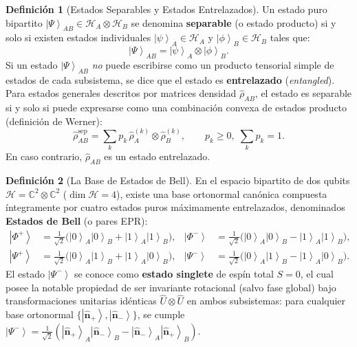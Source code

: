 \documentclass[11pt,a4paper,twoside]{report}
\theoremstyle{definition}
\newtheorem{definicion}{Definición}[chapter]
\theoremstyle{plain}
\theoremstyle{remark}
\newcommand{\ket}[1]{\left| #1 \right\rangle}
\newcommand{\Hil}{\mathcal{H}}
\newcommand{\op}[1]{\hat{#1}}
\begin{document}
\begin{definicion}[Estados Separables y Estados Entrelazados]
Un estado puro bipartito $\ket{\Psi}_{AB} \in \Hil_A \otimes \Hil_B$ se denomina \textbf{separable} (o estado producto) si y solo si existen estados individuales $\ket{\psi}_A \in \Hil_A$ y $\ket{\phi}_B \in \Hil_B$ tales que:
\begin{equation}
    \ket{\Psi}_{AB} = \ket{\psi}_A \otimes \ket{\phi}_B.
\end{equation}
Si un estado $\ket{\Psi}_{AB}$ \emph{no} puede escribirse como un producto tensorial simple de estados de cada subsistema, se dice que el estado es \textbf{entrelazado} (\textit{entangled}). Para estados generales descritos por matrices densidad $\op{\rho}_{AB}$, el estado es separable si y solo si puede expresarse como una combinación convexa de estados producto (definición de Werner):
\begin{equation}
    \op{\rho}_{AB}^{\text{sep}} = \sum_k p_k \, \op{\rho}_A^{(k)} \otimes \op{\rho}_B^{(k)}, \qquad p_k \ge 0,\; \sum_k p_k = 1.
\end{equation}
En caso contrario, $\op{\rho}_{AB}$ es un estado entrelazado.
\end{definicion}

\begin{definicion}[La Base de Estados de Bell]
En el espacio bipartito de dos qubits $\Hil = \mathbb{C}^2 \otimes \mathbb{C}^2$ ($\dim\Hil = 4$), existe una base ortonormal canónica compuesta íntegramente por cuatro estados puros máximamente entrelazados, denominados \textbf{Estados de Bell} (o pares EPR):
\begin{align}
    \ket{\Phi^+} &= \frac{1}{\sqrt{2}}\big(\ket{0}_A\ket{0}_B + \ket{1}_A\ket{1}_B\big), & \ket{\Phi^-} &= \frac{1}{\sqrt{2}}\big(\ket{0}_A\ket{0}_B - \ket{1}_A\ket{1}_B\big), \\
    \ket{\Psi^+} &= \frac{1}{\sqrt{2}}\big(\ket{0}_A\ket{1}_B + \ket{1}_A\ket{0}_B\big), & \ket{\Psi^-} &= \frac{1}{\sqrt{2}}\big(\ket{0}_A\ket{1}_B - \ket{1}_A\ket{0}_B\big).
\end{align}
El estado $\ket{\Psi^-}$ se conoce como \textbf{estado singlete} de espín total $S = 0$, el cual posee la notable propiedad de ser invariante rotacional (salvo fase global) bajo transformaciones unitarias idénticas $\op{U} \otimes \op{U}$ en ambos subsistemas: para cualquier base ortonormal $\{\ket{\bm{\hat{n}}_+}, \ket{\bm{\hat{n}}_-}\}$, se cumple $\ket{\Psi^-} = \frac{1}{\sqrt{2}}(\ket{\bm{\hat{n}}_+}_A\ket{\bm{\hat{n}}_-}_B - \ket{\bm{\hat{n}}_-}_A\ket{\bm{\hat{n}}_+}_B)$.
\end{definicion}
\end{document}
